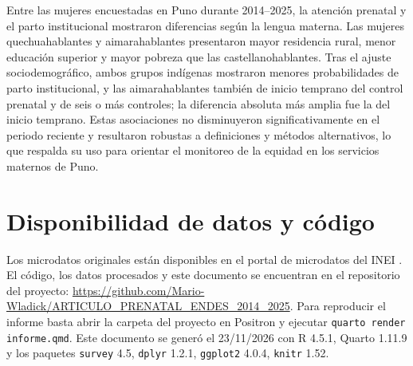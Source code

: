 \documentclass[
  spanish,
  letterpaper,
  conference]{IEEEtran}
\begin{document}
Entre las mujeres encuestadas en Puno durante 2014--2025, la atención
prenatal y el parto institucional mostraron diferencias según la lengua
materna. Las mujeres quechuahablantes y aimarahablantes presentaron
mayor residencia rural, menor educación superior y mayor pobreza que las
castellanohablantes. Tras el ajuste sociodemográfico, ambos grupos
indígenas mostraron menores probabilidades de parto institucional, y las
aimarahablantes también de inicio temprano del control prenatal y de
seis o más controles; la diferencia absoluta más amplia fue la del
inicio temprano. Estas asociaciones no disminuyeron significativamente
en el periodo reciente y resultaron robustas a definiciones y métodos
alternativos, lo que respalda su uso para orientar el monitoreo de la
equidad en los servicios maternos de Puno.

\section{Disponibilidad de datos y
código}\label{disponibilidad-de-datos-y-cuxf3digo}

Los microdatos originales están disponibles en el portal de microdatos
del INEI \citep{inei2025}. El código, los datos procesados y este
documento se encuentran en el repositorio del proyecto:
\url{https://github.com/Mario-Wladick/ARTICULO_PRENATAL_ENDES_2014_2025}.
Para reproducir el informe basta abrir la carpeta del proyecto en
Positron y ejecutar \texttt{quarto render informe.qmd}. Este documento
se generó el 23/11/2026 con R 4.5.1, Quarto 1.11.9 y los paquetes
\texttt{survey} 4.5, \texttt{dplyr} 1.2.1, \texttt{ggplot2} 4.0.4,
\texttt{knitr} 1.52.



\end{document}
